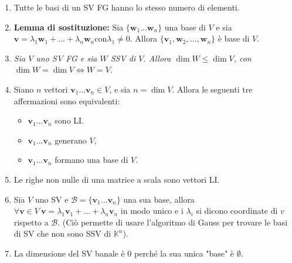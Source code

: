\documentclass[draft]{article}
\newcommand{\vv}{\mathbf{v}}
\newcommand{\vw}{\mathbf{w}}
\begin{document}
\begin{enumerate}
\item Tutte le basi di un SV FG hanno lo stesso numero di elementi.

\item \textbf{Lemma di sostituzione:} Sia $\{ \vw _1 ... \vw _n \}$ una base di $V$ e sia $\vv = \lambda _1 \vw _1 + ... + \lambda _n \vw _n \mathrm{con} \lambda _1 \neq 0$. Allora $\{ \vv _1 , \vw _2 , ... , \vw _n \}$ è base di $V$. 

\item \textit{Sia $V$ uno SV FG e sia $W$ SSV di $V$. Allora $\dim W \leq \dim V$, con $\dim W = \dim V \Leftrightarrow W=V$.}

\item Siano $n$ vettori $\vv _1 ... \vv _n \in V$, e sia $n=\dim V$. Allora le seguenti tre affermazioni sono equivalenti:
\begin{itemize}
\item $\vv _1 ... \vv _n$ sono LI.
\item $\vv _1 ... \vv _n$ generano $V$,
\item $\vv _1 ... \vv _n$ formano una base di $V$.
\end{itemize}

\item Le righe non nulle di una matrice a scala sono vettori LI.

\item Sia $V$ uno SV e $\mathcal{B} = \{ \vv _1 ... \vv _n \}$ una sua base, allora $\forall \vv \in V \ \vv = \lambda _1 \vv _1 + ... + \lambda _n \vv _n$ in modo unico e i $\lambda _i$ si dicono coordinate di $v$ rispetto a $\mathcal{B}$. (Ciò permette di usare l'algoritmo di Gauss per trovare le basi di SV che non sono SSV di $\mathbb{K}^n$).

\item La dimensione del SV banale è 0 perché la sua unica "base" è $\emptyset$.
\end{enumerate}
\end{document}
